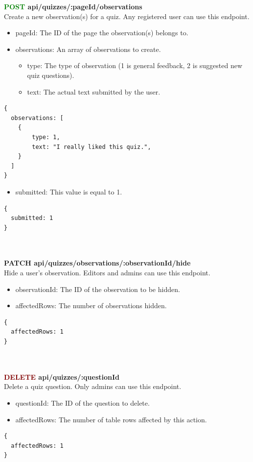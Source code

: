 \documentclass[onecolumn, draftclsnofoot,10pt, compsoc, usenames, dvipsnames]{IEEEtran}
\begin{document}
\noindent
\textbf{\textcolor{Green}{POST} api/quizzes/:pageId/observations} \\
Create a new observation(s) for a quiz. Any registered user can use this endpoint.
\begin{itemize}
    \item pageId: The ID of the page the observation(s) belongs to.
    \item observations: An array of observations to create.
    \begin{itemize}
        \item type: The type of observation (1 is general feedback, 2 is suggested new quiz questions).
        \item text: The actual text submitted by the user.
    \end{itemize}
\end{itemize}
\begin{lstlisting}[caption=Example Request Body]
{
  observations: [
    {
        type: 1,
        text: "I really liked this quiz.",
    }
  ]
}
\end{lstlisting}
\begin{itemize}
    \item submitted: This value is equal to 1.
\end{itemize}
\begin{lstlisting}[caption=Example Response]
{
  submitted: 1
}
\end{lstlisting}
\\~\\


\noindent
\textbf{\textcolor{BlueGreen}{PATCH} api/quizzes/observations/:observationId/hide} \\
Hide a user's observation. Editors and admins can use this endpoint.
\begin{itemize}
    \item observationId: The ID of the observation to be hidden.
    \item affectedRows: The number of observations hidden.
\end{itemize}
\begin{lstlisting}[caption=Example Response]
{
  affectedRows: 1
}
\end{lstlisting}
\\~\\


\noindent
\textbf{\textcolor{Maroon}{DELETE} api/quizzes/:questionId} \\
Delete a quiz question. Only admins can use this endpoint.
\begin{itemize}
  \item questionId: The ID of the question to delete.
  \item affectedRows: The number of table rows affected by this action.
\end{itemize}
\begin{lstlisting}[caption=Example Response]
{ 
  affectedRows: 1
}
\end{lstlisting}
\\~\\
\end{document}
